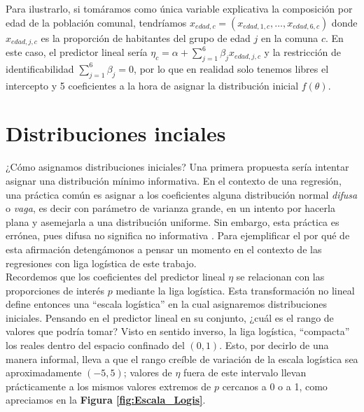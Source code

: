 Para ilustrarlo, si tomáramos como única variable explicativa la composición por edad de la población comunal, tendríamos $x_{edad,c}=(x_{edad,1,c}, \dots, x_{edad,6,c})$ donde $x_{edad,j,c}$ es la proporción de habitantes del grupo de edad $j$ en la comuna $c$. En este caso, el predictor lineal sería $\eta_c = \alpha + \sum\limits_{j=1}^6 \beta_j x_{edad,j,c}$ y la restricción de identificabilidad $\sum\limits_{j=1}^{6}\beta_j=0$, por lo que en realidad solo tenemos libres el intercepto y 5 coeficientes a la hora de asignar la distribución inicial $f(\theta)$. 

\section{Distribuciones inciales} \label{Secc_Iniciales}

¿Cómo asignamos distribuciones iniciales? Una primera propuesta sería intentar asignar una distribución mínimo informativa. En el contexto de una regresión, una práctica común es asignar a los coeficientes alguna distribución normal \textit{difusa} o \textit{vaga}, es decir con parámetro de varianza grande, en un intento por hacerla plana y asemejarla a una distribución uniforme. Sin embargo, esta práctica es errónea, pues difusa no significa no informativa \parencite{BetancourtStanShapePriors}. Para ejemplificar el por qué de esta afirmación detengámonos a pensar un momento en el contexto de las regresiones con liga logística de este trabajo.\\ 

Recordemos que los coeficientes del predictor lineal $\eta$ se relacionan con las proporciones de interés $p$ mediante la liga logística. Esta transformación no lineal define entonces una ``escala logística'' en la cual asignaremos distribuciones iniciales. Pensando en el predictor lineal en su conjunto, ¿cuál es el rango de valores que podría tomar? Visto en sentido inverso, la liga logística, ``compacta'' los reales dentro del espacio confinado del $\left(0,1\right)$. Esto, por decirlo de una manera informal, lleva a que el rango creíble de variación de la escala logística sea aproximadamente $(-5,5)$; valores de $\eta$ fuera de este intervalo llevan prácticamente a los mismos valores extremos de $p$ cercanos a 0 o a 1, como apreciamos en la \textbf{Figura \ref{fig:Escala_Logis}}.\\

